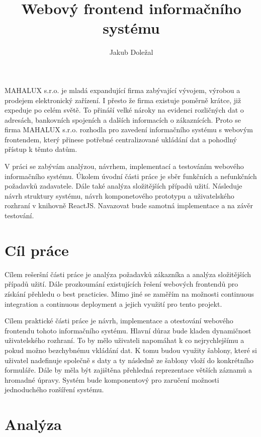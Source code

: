 \documentclass[thesis=B,czech]{FITthesis}[2012/06/26]
\title{Webový frontend informačního systému}
\author{Jakub Doležal} %
\begin{document}

\begin{introduction}
	MAHALUX s.r.o. je mladá expandující firma zabývající vývojem, výrobou a prodejem elektronický zařízení. I přesto že firma existuje poměrně krátce, již expeduje po celém světě. To přináší velké nároky na evidenci rozličných dat o adresách, bankovních spojeních a dalších informacích o zákaznících. Proto se firma MAHALUX s.r.o. rozhodla pro zavedení informačního systému s webovým frontendem, který přinese potřebné centralizované ukládání dat a pohodlný přístup k těmto datům.
	
	V práci se zabývám analýzou, návrhem, implementací a testováním webového informačního systému.
	Úkolem úvodní části práce je sběr funkčních a nefunkčních požadavků zadavatele. Dále také analýza složitějších případů užití.
	Následuje návrh struktury systému, návrh komponetového prototypu a uživatelského rozhraní v knihovně ReactJS. Navazovat bude samotná implementace a na závěr testování.
\end{introduction}

\chapter{Cíl práce}
	Cílem rešeršní části práce je analýza požadavků zákazníka a analýza složitějších případů užití. Dále prozkoumání existujících řešení webových frontendů pro získání přehledu o best practicies. Mimo jiné se zaměřím na možnosti continuous integration a continuous deployment a jejich využití pro tento projekt.
	
	Cílem praktické části práce je návrh, implementace a otestování webového frontendu tohoto informačního systému. Hlavní důraz bude kladen dynamičnost uživatelského rozhraní. To by mělo uživateli napomáhat k co nejrychlejšímu a pokud možno bezchybnému vkládání dat. K tomu budou využity šablony, které si uživatel nadefinuje společně s daty a ty následně ze šablony vloží do konkrétního formuláře. Dále by měla být zajištěna přehledná reprezentace větších záznamů a hromadné úpravy. Systém bude komponentový pro zaručení možnosti jednoduchého rozšíření systému.
	
\chapter{Analýza}
\end{document}
